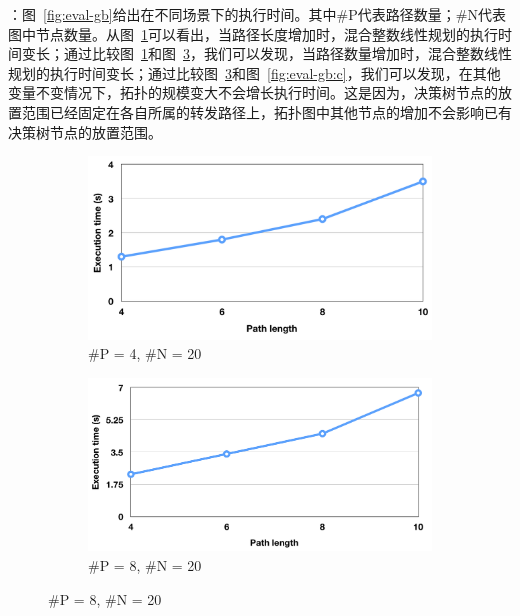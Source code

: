 ：图~\ref{fig:eval-gb}给出在不同场景下的执行时间。其中\#P代表路径数量；\#N代表图中节点数量。从图~\ref{fig:eval-gb:a}可以看出，当路径长度增加时，混合整数线性规划的执行时间变长；通过比较图~\ref{fig:eval-gb:a}和图~\ref{fig:eval-gb:b}，我们可以发现，当路径数量增加时，混合整数线性规划的执行时间变长；通过比较图~\ref{fig:eval-gb:b}和图~\ref{fig:eval-gb:c}，我们可以发现，在其他变量不变情况下，拓扑的规模变大不会增长执行时间。这是因为，决策树节点的放置范围已经固定在各自所属的转发路径上，拓扑图中其他节点的增加不会影响已有决策树节点的放置范围。


\begin{figure}
  \centering

  \begin{subfigure}[b]{0.4\textwidth}
      \includegraphics[width=\textwidth]{figures/global-eval-420-png.png}
      \caption{\#P = 4, \#N = 20}
      \label{fig:eval-gb:a}
  \end{subfigure}

  \hspace{1in}

  \begin{subfigure}[b]{0.4\textwidth}
      \includegraphics[width=\textwidth]{figures/global-eval-820-png.png}
      \caption{\#P = 8, \#N = 20}
      \label{fig:eval-gb:b}
  \end{subfigure}


\end{figure}

